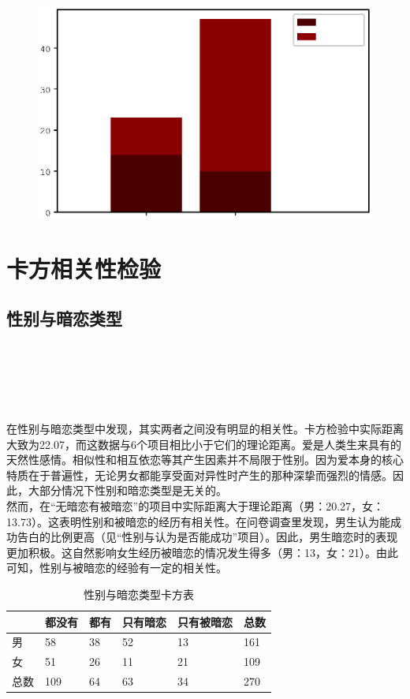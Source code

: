 \documentclass[10pt, a4paper, twocolumn]{ctexart}
\begin{document}
\begin{figure}[htbp]
	\centering
	\label{c100}
	\includegraphics[width = 0.8\linewidth]{c12.eps}
\end{figure}

\section{卡方相关性检验}
\subsection{性别与暗恋类型}
\\\\\\\\\\在性别与暗恋类型中发现，其实两者之间没有明显的相关性。卡方检验中实际距离大致为22.07，而这数据与6个项目相比小于它们的理论距离。爱是人类生来具有的天然性感情。相似性和相互依恋等其产生因素并不局限于性别。因为爱本身的核心特质在于普遍性，无论男女都能享受面对异性时产生的那种深挚而强烈的情感。因此，大部分情况下性别和暗恋类型是无关的。\\
\indent 然而，在“无暗恋有被暗恋”的项目中实际距离大于理论距离（男：20.27，女：13.73）。这表明性别和被暗恋的经历有相关性。在问卷调查里发现，男生认为能成功告白的比例更高（见“性别与认为是否能成功”项目）。因此，男生暗恋时的表现更加积极。这自然影响女生经历被暗恋的情况发生得多（男：13，女：21）。由此可知，性别与被暗恋的经验有一定的相关性。\\
\begin{table}[htbp]
	\small
	\caption{性别与暗恋类型卡方表}
	\centering
	\begin{tabular}{llllll}
		 & 都没有 & 都有 & 只有暗恋&只有被暗恋&总数 \\
		\midrule
		男&58&38&52&13&161 \\
		女&51&26&11&21&109 \\
		\midrule
		总数&109&64&63&34&270\\
		\bottomrule
	\end{tabular}
\end{table}
\\\\
\end{document}
